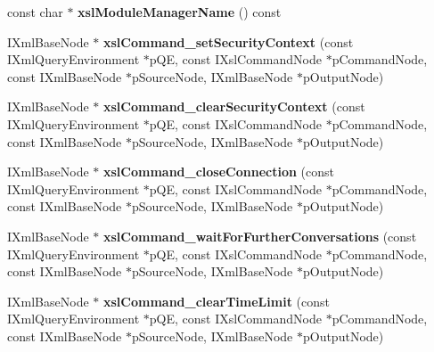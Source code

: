 \begin{DoxyCompactItemize}
\item 
\hypertarget{classgeneral__server_1_1Conversation_aa4122917ea2f786ae0d094f7d973b588}{const char $\ast$ {\bfseries xsl\-Module\-Manager\-Name} () const }\label{classgeneral__server_1_1Conversation_aa4122917ea2f786ae0d094f7d973b588}

\item 
\hypertarget{group__XSLModule-Commands_gac31e7d301c3d86dce0e55b79fbad1720}{\-I\-Xml\-Base\-Node $\ast$ {\bfseries xsl\-Command\-\_\-set\-Security\-Context} (const \-I\-Xml\-Query\-Environment $\ast$p\-Q\-E, const \-I\-Xsl\-Command\-Node $\ast$p\-Command\-Node, const \-I\-Xml\-Base\-Node $\ast$p\-Source\-Node, \-I\-Xml\-Base\-Node $\ast$p\-Output\-Node)}\label{group__XSLModule-Commands_gac31e7d301c3d86dce0e55b79fbad1720}

\item 
\hypertarget{group__XSLModule-Commands_gadd48d969a11a313bd97694f245e9b4da}{\-I\-Xml\-Base\-Node $\ast$ {\bfseries xsl\-Command\-\_\-clear\-Security\-Context} (const \-I\-Xml\-Query\-Environment $\ast$p\-Q\-E, const \-I\-Xsl\-Command\-Node $\ast$p\-Command\-Node, const \-I\-Xml\-Base\-Node $\ast$p\-Source\-Node, \-I\-Xml\-Base\-Node $\ast$p\-Output\-Node)}\label{group__XSLModule-Commands_gadd48d969a11a313bd97694f245e9b4da}

\item 
\hypertarget{group__XSLModule-Commands_ga05c29c86a1739327f3771ec1a980e4e0}{\-I\-Xml\-Base\-Node $\ast$ {\bfseries xsl\-Command\-\_\-close\-Connection} (const \-I\-Xml\-Query\-Environment $\ast$p\-Q\-E, const \-I\-Xsl\-Command\-Node $\ast$p\-Command\-Node, const \-I\-Xml\-Base\-Node $\ast$p\-Source\-Node, \-I\-Xml\-Base\-Node $\ast$p\-Output\-Node)}\label{group__XSLModule-Commands_ga05c29c86a1739327f3771ec1a980e4e0}

\item 
\hypertarget{group__XSLModule-Commands_ga9d22734fc0fa84a55ed1f8d081679e89}{\-I\-Xml\-Base\-Node $\ast$ {\bfseries xsl\-Command\-\_\-wait\-For\-Further\-Conversations} (const \-I\-Xml\-Query\-Environment $\ast$p\-Q\-E, const \-I\-Xsl\-Command\-Node $\ast$p\-Command\-Node, const \-I\-Xml\-Base\-Node $\ast$p\-Source\-Node, \-I\-Xml\-Base\-Node $\ast$p\-Output\-Node)}\label{group__XSLModule-Commands_ga9d22734fc0fa84a55ed1f8d081679e89}

\item 
\hypertarget{group__XSLModule-Commands_gaf2de48d9e9ae0b9fed051bff99d83df6}{\-I\-Xml\-Base\-Node $\ast$ {\bfseries xsl\-Command\-\_\-clear\-Time\-Limit} (const \-I\-Xml\-Query\-Environment $\ast$p\-Q\-E, const \-I\-Xsl\-Command\-Node $\ast$p\-Command\-Node, const \-I\-Xml\-Base\-Node $\ast$p\-Source\-Node, \-I\-Xml\-Base\-Node $\ast$p\-Output\-Node)}\label{group__XSLModule-Commands_gaf2de48d9e9ae0b9fed051bff99d83df6}


\end{DoxyCompactItemize}
